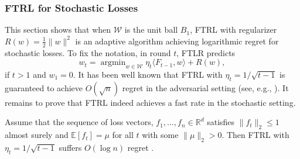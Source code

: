\documentclass[english]{article}
\newcommand{\cW}{\mathcal{W}}
\newcommand{\Exp}[1]{\mathbb{E}\left[ #1 \right]}
\newcommand{\R}{\mathbb{R}}
\newcommand{\inpro}[2]{\langle #1, #2\rangle}
\DeclareMathOperator*{\argmin}{argmin}
\begin{document}
\subsubsection{FTRL for Stochastic Losses}
\label{subsubsec:FTRLunitball}
This section shows that when $\cW$ is the unit ball $B_1$, FTRL with regularizer $R(w) = \frac{1}{2}\|w\|^2$ is an adaptive algorithm achieving logarithmic regret for stochastic losses. To fix the notation, in round $t$, FTLR predicts
\[
	w_{t} = \argmin_{w\in \cW} \eta_t \inpro{F_{t-1}}{w} + R(w), 
\]
if $t >1$ and $w_1=0$.
It has been well known that FTRL with $\eta_t = 1/\sqrt{t-1}$ is guaranteed to achieve $O(\sqrt{n})$ regret in the adversarial setting (see, e.g., \citealp{SS12:Book}). It remains to prove that FTRL indeed achieves a fast rate in the stochastic setting. 
\begin{theorem}
	Assume that the sequence of loss vectors, $f_1,\ldots,f_n \in \R^d$  satisfies $\|f_t\|_2 \le 1$ almost surely and $\Exp{f_t} = \mu$ for all $t$ with some $\|\mu\|_2 >0$. Then FTRL with $\eta_t=1/\sqrt{t-1}$ suffers $O(\log n)$ regret .
\end{theorem}
\end{document}
